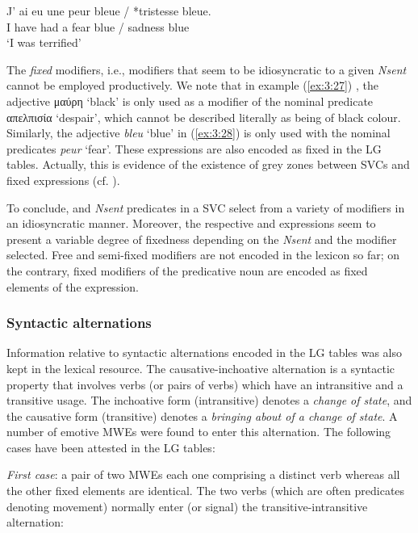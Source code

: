 \documentclass[output=paper]{langsci/langscibook}
\begin{document}
\begin{exe}
\ex \label{ex:3:28}
\gll  J' ai eu une peur bleue / *tristesse bleue. \\
I have had a fear blue / sadness blue\\
\glt %
‘I was terrified’
\end{exe}
 
The\textit{ fixed} modifiers, i.e., modifiers that seem to be
idiosyncratic to a given \textit{Nsent} cannot be employed
productively. We note that in example (\ref{ex:3:27}) , the adjective
μαύρη ‘black’ is only used as a modifier of the nominal
predicate απελπισία ‘despair’, which cannot be described
literally as being of black colour. Similarly, the  adjective
\textit{bleu }‘blue’ in (\ref{ex:3:28}) is only used with the nominal predicates
\textit{peur }‘fear’. These expressions are also encoded as fixed in
the LG tables. Actually, this is evidence of the existence of grey
zones between SVCs and fixed expressions (cf. ).



To conclude,  and  \textit{Nsent} predicates in a SVC select from
a variety of modifiers in an idiosyncratic manner. Moreover, the
respective  and  expressions seem to present a variable degree of
fixedness depending on the \textit{Nsent} and the modifier selected.
Free and semi-fixed modifiers are not encoded in the lexicon so far; on
the contrary, fixed modifiers of the predicative noun are encoded as
fixed elements of the expression.


\subsubsection{Syntactic alternations}


Information relative to syntactic alternations encoded in the LG tables
was also kept in the lexical resource.  The
causative-inchoative alternation is a syntactic property that involves
verbs (or pairs of verbs) which have an intransitive and a transitive
usage. The inchoative form (intransitive) denotes a \textit{change of
state}, and the causative form (transitive) denotes a \textit{bringing about of a
change of state}. A number of emotive MWEs were found to enter this
alternation. The following cases have been attested in the LG tables:

\textit{First case}: a pair of two MWEs each one comprising a distinct verb whereas all the
other fixed elements are identical. The two verbs (which are often
predicates denoting movement) normally enter (or signal) the
transitive-intransitive alternation:
\end{document}
